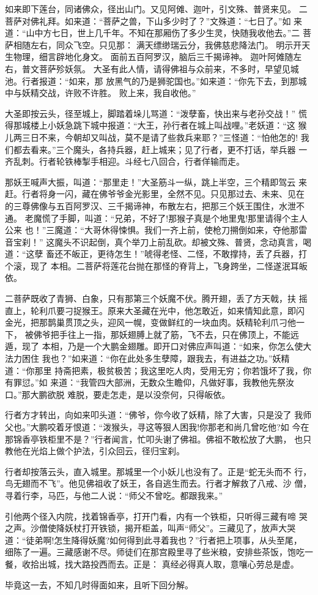 如来即下莲台，同诸佛众，径出山门。又见阿傩、迦叶，引文殊、普贤来见。
二菩萨对佛礼拜。如来道：“菩萨之兽，下山多少时了？”文殊道：“七日了。”如
来道：“山中方七日，世上几千年。不知在那厢伤了多少生灵，快随我收他去。”二
菩萨相随左右，同众飞空。只见那：
满天缥缈瑞云分，我佛慈悲降法门。
明示开天生物理，细言辟地化身文。
面前五百阿罗汉，脑后三千揭谛神。
迦叶阿傩随左右，普文菩萨殄妖氛。
大圣有此人情，请得佛祖与众前来，不多时，早望见城池。行者报道：“如来，那
放黑气的乃是狮驼国也。”如来道：“你先下去，到那城中与妖精交战，许败不许胜。
败上来，我自收他。”

大圣即按云头，径至城上，脚踏着垛儿骂道：“泼孽畜，快出来与老孙交战！”
慌得那城楼上小妖急跳下城中报道：“大王，孙行者在城上叫战哩。”老妖道：“这
猴儿两三日不来，今朝却又叫战，莫不是请了些救兵来耶？”三怪道：“怕他怎的!
我们都去看来。”三个魔头，各持兵器，赶上城来；见了行者，更不打话，举兵器
一齐乱刺。行者轮铁棒掣手相迎。斗经七八回合，行者佯输而走。

那妖王喊声大振，叫道：“那里走！”大圣筋斗一纵，跳上半空，三个精即驾云
来赶。行者将身一闪，藏在佛爷爷金光影里，全然不见。只见那过去、未来、见在
的三尊佛像与五百阿罗汉、三千揭谛神，布散左右，把那三个妖王围住，水泄不通。
老魔慌了手脚，叫道：“兄弟，不好了!那猴子真是个地里鬼!那里请得个主人公来
也！”三魔道：“大哥休得悚惧。我们一齐上前，使枪刀搠倒如来，夺他那雷音宝刹！”
这魔头不识起倒，真个举刀上前乱砍。却被文殊、普贤，念动真言，喝道：“这孽
畜还不皈正，更待怎生！”唬得老怪、二怪，不敢撑持，丢了兵器，打个滚，现了
本相。二菩萨将莲花台抛在那怪的脊背上，飞身跨坐，二怪遂泯耳皈依。

二菩萨既收了青狮、白象，只有那第三个妖魔不伏。腾开翅，丢了方天戟，扶
摇直上，轮利爪要刁捉猴王。原来大圣藏在光中，他怎敢近，如来情知此意，即闪
金光，把那鹊巢贯顶之头，迎风一幌，变做鲜红的一块血肉。妖精轮利爪刁他一下，
被佛爷把手往上一指，那妖翅膊上就了筋，飞不去，只在佛顶上，不能远遁，现了
本相，乃是一个大鹏金翅雕。即开口对佛应声叫道：“如来，你怎么使大法力困住
我也？”如来道：“你在此处多生孽障，跟我去，有进益之功。”妖精道：“你那里
持斋把素，极贫极苦；我这里吃人肉，受用无穷；你若饿坏了我，你有罪愆。”如
来道：“我管四大部洲，无数众生瞻仰，凡做好事，我教他先祭汝口。”那大鹏欲脱
难脱，要走怎走，是以没奈何，只得皈依。

行者方才转出，向如来叩头道：“佛爷，你今收了妖精，除了大害，只是没了
我师父也。”大鹏咬着牙恨道：“泼猴头，寻这等狠人困我!你那老和尚几曾吃他?如
今在那锦香亭铁柜里不是？”行者闻言，忙叩头谢了佛祖。佛祖不敢松放了大鹏，
也只教他在光焰上做个护法，引众回云，径归宝刹。

行者却按落云头，直入城里。那城里一个小妖儿也没有了。正是“蛇无头而不
行，鸟无翅而不飞”。他见佛祖收了妖王，各自逃生而去。行者才解救了八戒、沙
僧，寻着行李，马匹，与他二人说：“师父不曾吃。都跟我来。”

引他两个径入内院，找着锦香亭，打开门看，内有一个铁柜，只听得三藏有啼
哭之声。沙僧使降妖杖打开铁锁，揭开柜盖，叫声“师父”。三藏见了，放声大哭
道：“徒弟啊!怎生降得妖魔?如何得到此寻着我也？”行者把上项事，从头至尾，
细陈了一遍。三藏感谢不尽。师徒们在那宫殿里寻了些米粮，安排些茶饭，饱吃一
餐，收拾出城，找大路投西而去。正是：
真经必得真人取，意嚷心劳总是虚。

毕竟这一去，不知几时得面如来，且听下回分解。